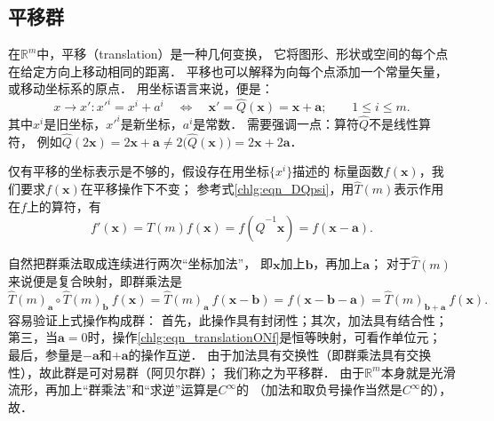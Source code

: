 
\subsection{平移群}\label{chlg:sec_translation-group}
在$\mathbb{R}^m$中，{\heiti 平移}（translation）是一种几何变换，
它将图形、形状或空间的每个点在给定方向上移动相同的距离．
平移也可以解释为向每个点添加一个常量矢量，或移动坐标系的原点．
用坐标语言来说，便是：
\begin{equation}\label{chlg:eqn_translation}
    x\to x' : x'^{i} = x^i + a^i 
    \quad \Leftrightarrow \quad
    \boldsymbol{x}' =\hat{Q}(\boldsymbol{x})= \boldsymbol{x} + \boldsymbol{a} ;
    \qquad 1 \leqslant i \leqslant m .
\end{equation}
其中$x^i$是旧坐标，$x'^i$是新坐标，$a^i$是常数．
需要强调一点：算符$\hat{Q}$不是线性算符，
例如$\hat{Q} (2 \boldsymbol{x}) =2 \boldsymbol{x} + \boldsymbol{a} \neq 
2\bigl(\hat{Q}(\boldsymbol{x})\bigr)=2 \boldsymbol{x} + 2\boldsymbol{a}$．

仅有平移的坐标表示是不够的，假设存在用坐标$\{x^i\}$描述的
标量函数$f(\boldsymbol{x})$，我们要求$f(\boldsymbol{x})$在平移操作下不变；
参考式\eqref{chlg:eqn_DQpsi}，用$\hat{T}(m)$表示作用在$f$上的算符，有
\begin{equation}\label{chlg:eqn_translationONf}
    f'(\boldsymbol{x})=\hat{T}(m) f(\boldsymbol{x})= f(\hat{Q}^{-1}\boldsymbol{x}) = f(\boldsymbol{x} - \boldsymbol{a}) .
\end{equation}


自然把群乘法取成连续进行两次“坐标加法”，
即$\boldsymbol{x}$加上$\boldsymbol{b}$，再加上$\boldsymbol{a}$；
对于$\hat{T}(m)$来说便是复合映射，即群乘法是
\begin{equation*}
    \hat{T}(m)_{\boldsymbol{a}}\circ \hat{T}(m)_{\boldsymbol{b}}\ f(\boldsymbol{x}) 
    = \hat{T}(m)_{\boldsymbol{a}}\ f(\boldsymbol{x} - \boldsymbol{b}) 
    = f(\boldsymbol{x} - \boldsymbol{b} - \boldsymbol{a}) 
    = \hat{T}(m)_{\boldsymbol{b}+ \boldsymbol{a}}\ f(\boldsymbol{x}) .
\end{equation*}
容易验证上式操作构成群：
首先，此操作具有封闭性；其次，加法具有结合性；
第三，当$\boldsymbol{a}=0$时，操作\eqref{chlg:eqn_translationONf}是恒等映射，可看作单位元；
最后，参量是$-\boldsymbol{a}$和$+\boldsymbol{a}$的操作互逆．
由于加法具有交换性（即群乘法具有交换性），故此群是可对易群（阿贝尔群）；
我们称之为{\heiti 平移群}．
由于$\mathbb{R}^m$本身就是光滑流形，再加上“群乘法”和“求逆”运算是$C^\infty$的
（加法和取负号操作当然是$C^\infty$的），故．

